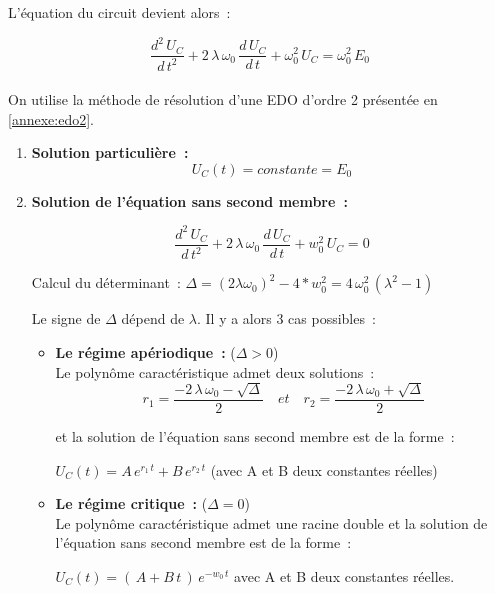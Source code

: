 L'équation du circuit devient alors~:

$$ \dfrac{d^{2}\,U_C}{d\,t^2} + 2\,\lambda\,\omega_0\,\dfrac{d\,U_C}{d\,t} + \omega_0^2\,U_C = \omega_0^2\,E_0 $$\\

On utilise la méthode de résolution d'une EDO d'ordre 2 présentée en \autoref{annexe:edo2}.

\begin{enumerate}

\item \textbf{Solution particulière~:} 
	$$U_C(t) = constante = E_0$$ 

\item \textbf{Solution de l'équation sans second membre~:}

$$ \dfrac{d^{2}\,U_C}{d\,t^2} + 2\,\lambda\,\omega_0\,\dfrac{d\,U_C}{d\,t} + w_0^2\,U_C = 0 $$

		Calcul du déterminant~: $\Delta = (2\lambda\omega_0)^2 - 4 * w_0^2 = 4\, \omega_0^2\,(\lambda^2 - 1 )$ 

	Le signe de $\Delta $ dépend de $\lambda $. Il y a alors 3 cas possibles~:\\

	\begin{itemize}
		\item \textbf{Le régime apériodique~:} ($\Delta > 0 $) \\

			Le polynôme caractéristique admet deux solutions~:
			$$ r_1 = \dfrac{ -2\,\lambda\,\omega_0 - \sqrt{\Delta}}{ 2 } \quad et \quad	r_2 = \dfrac{ -2\,\lambda\,\omega_0 + \sqrt{\Delta}}{ 2 }  $$

			et la solution de l'équation sans second membre est de la forme~:\\
			\begin{center}
				$U_C(t) = A\,e^{r_1\,t} + B\,e^{r_2\,t}$ (avec A et B deux constantes réelles)
			\end{center}
		\bigskip
		\item \textbf{Le régime critique~:} ($\Delta = 0$)\\	

			Le polynôme caractéristique admet une racine double et la solution de l'équation sans second membre est de la forme~:\\

			\begin{center}
			$U_C(t) = (\,A + B\,t\,)\,e^{ -w_0\,t} $ avec A et B deux constantes réelles. \\
			\end{center}
					

\end{itemize}
\end{enumerate}

